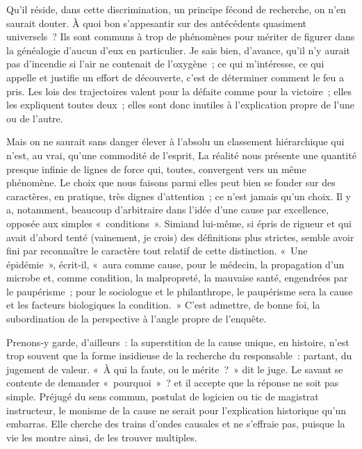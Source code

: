 \documentclass[french,twoside]{book} %
\newcommand{\astermono}{\medskip\centerline{\color{rubric}\large\selectfont{\syms ✻}}\medskip\par}%
\begin{document}
\astermono

\noindent Qu’il réside, dans cette discrimination, un principe fécond de recherche, on n’en saurait douter. À quoi bon s’appesantir sur des antécédents quasiment universels ? Ils sont communs à trop de phénomènes pour mériter de figurer dans la généalogie d’aucun d’eux en particulier. Je sais bien, d’avance, qu’il n’y aurait pas d’incendie si l’air ne contenait de l’oxygène ; ce qui m’intéresse, ce qui appelle et justifie un effort de découverte, c’est de déterminer comment le feu a pris. Les lois des tra­jectoires valent pour la défaite comme pour la victoire ; elles les expliquent toutes deux ; elles sont donc inutiles à l’explication propre de l’une ou de l’autre.\par
Mais on ne saurait sans danger élever à l’absolu un classement hiérar­chique qui n’est, au vrai, qu’une commodité de l’esprit, La réalité nous présente une quantité presque infinie de lignes de force qui, toutes, con­vergent vers un même phénomène. Le choix que nous faisons parmi elles peut bien se fonder sur des caractères, en pratique, très dignes d’attention ; ce n’est jamais qu’un choix. Il y a, notamment, beaucoup d’arbitraire dans l’idée d’une cause par excellence, opposée aux simples « conditions ».  
\label{p101} Simiand lui-même, si épris de rigueur et qui avait d’abord tenté (vaine­ment, je crois) des définitions plus strictes, semble avoir fini par recon­naître le caractère tout relatif de cette distinction. « Une épidémie », écrit‑il, « aura comme cause, pour le médecin, la propagation d’un microbe et, comme condition, la malpropreté, la mauvaise santé, engendrées par le paupérisme ; pour le sociologue et le philanthrope, le paupérisme sera la cause et les facteurs biologiques la condition. » C’est admettre, de bonne foi, la subordination de la perspective à l’angle propre de l’enquête.\par
Prenons‑y garde, d’ailleurs : la superstition de la cause unique, en histoire, n’est trop souvent que la forme insidieuse de la recherche du respon­sable : partant, du jugement de valeur. « À qui la faute, ou le mérite ? » dit le juge. Le savant se contente de demander « pourquoi » ? et il accepte que la réponse ne soit pas simple. Préjugé du sens commun, postulat de logicien ou tic de magistrat instructeur, le monisme de la cause ne serait pour l’explication historique qu’un embarras. Elle cherche des trains d’ondes causales et ne s’effraie pas, puisque la vie les montre ainsi, de les trouver multiples.\par
\end{document}
